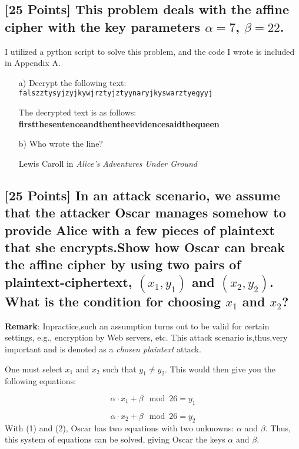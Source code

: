\documentclass{article}
\begin{document}
\subsection{[25 Points] This problem deals with the affine cipher with the key parameters $\alpha = 7$, $\beta = 22$.}
I utilized a python script to solve this problem, and the code I wrote is included in Appendix A.
\begin{enumerate}
    \setlength{\itemsep}{20pt}%
    \item[a)] Decrypt the following text: \texttt{falszztysyjzyjkywjrztyjztyynaryjkyswarztyegyyj}
    
    The decrypted text is as follows:  \textbf{firstthesentenceandthentheevidencesaidthequeen}
    \item[b)] Who wrote the line?
    
    Lewis Caroll in \textit{Alice's Adventures Under Ground}
    \item[]
\end{enumerate}

\setcounter{subsection}{12}
\subsection{[25 Points] In an attack scenario, we assume that the attacker Oscar manages somehow to provide Alice with a few pieces of plaintext that she encrypts.Show how Oscar can break the affine cipher by using two pairs of plaintext-ciphertext, $(x_1 ,y_1)$ and $(x_2 ,y_2)$. What is the condition for choosing $x_1$ and $x_2$?}

\textbf{Remark}:  Inpractice,such an assumption turns out to be valid for certain settings, e.g., encryption by Web servers, etc. This attack scenario is,thus,very important and is denoted as a \emph{chosen plaintext} attack.
\vspace{1cm}

One must select $x_1$ and $x_2$ such that $y_1 \neq y_2$.
This would then give you the following equations:

\begin{equation}
\label{Eq1}
\alpha \cdot x_1 + \beta \mod 26 = y_1
\end{equation}

\begin{equation}
\label{Eq2}
\alpha \cdot x_2 + \beta \mod 26 = y_2
\end{equation}
With (1) and (2), Oscar has two equations with two unknowns: $\alpha$ and $\beta$. Thus, this system of equations can be solved, giving Oscar the keys $\alpha$ and $\beta$.
\end{document}
